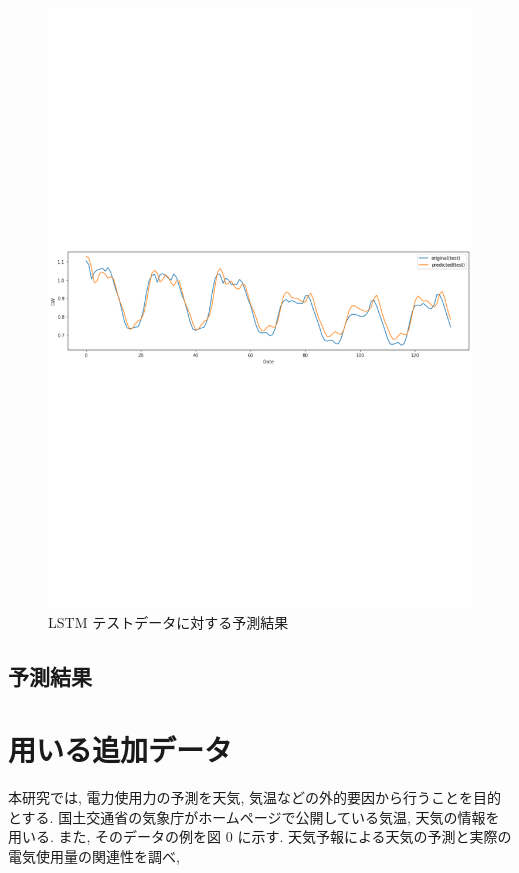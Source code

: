 \begin{figure}[phb]
\begin{center}
\includegraphics[scale=0.55]{lstm_pred_day.pdf}
\vspace{-75mm}
\caption{LSTM テストデータに対する予測結果}
\end{center}
\end{figure}

\subsection{予測結果}

\section{用いる追加データ}
本研究では, 電力使用力の予測を天気, 気温などの外的要因から行うことを目的とする.
国土交通省の気象庁がホームページで公開している気温, 天気の情報を用いる.
また, そのデータの例を図 0 に示す. 天気予報による天気の予測と実際の電気使用量の関連性を調べ, 

